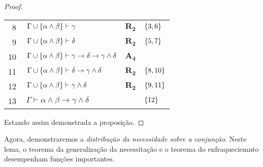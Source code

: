 \begin{tcolorbox}[enhanced jigsaw, breakable, sharp corners, colframe=black, colback=white, boxrule=0.5pt, left=1.5mm, right=1.5mm, top=1.5mm, bottom=1.5mm]
\begin{lemma}
\begin{proof}
\begin{xltabular}{\textwidth}{r | X l l}
            \scriptsize{\phantom{0}8}\phantom{ } & $\ \Gamma\cup\set{\alpha\wedge\beta}\vdash\gamma$                                & $\hyperref[modal.rule.2]{\mathbf{R_2}}$            & $\left\{3,6\right\}$\\[\rowskip]
            \scriptsize{\phantom{0}9}\phantom{ } & $\ \Gamma\cup\set{\alpha\wedge\beta}\vdash\delta$                                & $\hyperref[modal.rule.2]{\mathbf{R_2}}$            & $\left\{5,7\right\}$\\[\rowskip]
            \scriptsize{10}\phantom{ }           & $\ \Gamma\cup\set{\alpha\wedge\beta}\vdash\gamma\to\delta\to\gamma\wedge\delta$  & $\hyperref[modal.axiom.3]{\mathbf{A_4}}$           & \\[\rowskip]
            \scriptsize{11}\phantom{ }           & $\ \Gamma\cup\set{\alpha\wedge\beta}\vdash\delta\to\gamma\wedge\delta$           & $\hyperref[modal.rule.2]{\mathbf{R_2}}$            & $\left\{8,10\right\}$\\[\rowskip]
            \scriptsize{12}\phantom{ }           & $\ \Gamma\cup\set{\alpha\wedge\beta}\vdash\gamma\wedge\delta$                    & $\hyperref[modal.rule.2]{\mathbf{R_2}}$            & $\left\{9,11\right\}$\\[\rowskip]
            \scriptsize{13}\phantom{ }           & $\ \Gamma\vdash\alpha\wedge\beta\to\gamma\wedge\delta$                           &                                & $\left\{12\right\}$
        \end{xltabular}
        \normalsize

        \vspace{0.5\baselineskip}
        Estando assim demonstrada a proposição.
        \end{proof}
    \end{lemma}
\end{tcolorbox}

\vspace{.5\baselineskip}
Agora, demonstraremos a \emph{distribução da necessidade sobre a conjunção}.
Neste lema, o teorema da generalização da necessitação e o teorema do enfraqueciemnto desempenham funções importantes.

